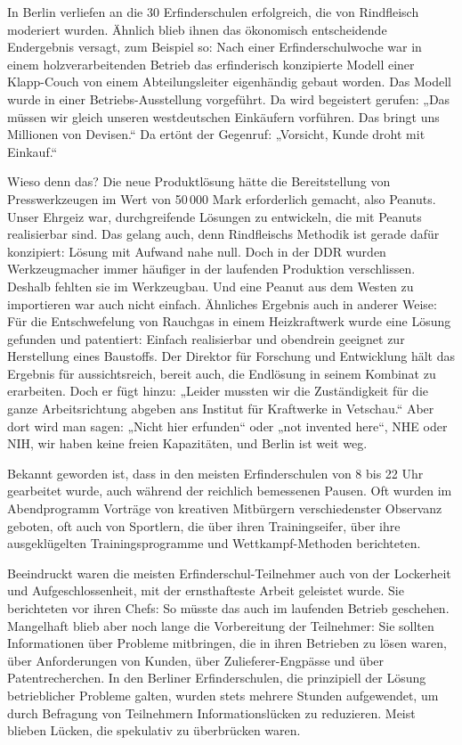 \documentclass[11pt,a4paper]{article}
\begin{document}
In Berlin verliefen an die 30 Erfinderschulen erfolgreich, die von Rindfleisch
moderiert wurden. Ähnlich blieb ihnen das ökonomisch entscheidende Endergebnis
versagt, zum Beispiel so: Nach einer Erfinderschulwoche war in einem
holzverarbeitenden Betrieb das erfinderisch konzipierte Modell einer
Klapp-Couch von einem Abteilungsleiter eigenhändig gebaut worden. Das Modell
wurde in einer Betriebs-Ausstellung vorgeführt. Da wird begeistert gerufen:
„Das müssen wir gleich unseren westdeutschen Einkäufern vorführen. Das bringt
uns Millionen von Devisen.“ Da ertönt der Gegenruf: „Vorsicht, Kunde droht mit
Einkauf.“

Wieso denn das? Die neue Produktlösung hätte die Bereitstellung von
Presswerkzeugen im Wert von 50\,000 Mark erforderlich gemacht, also Peanuts.
Unser Ehrgeiz war, durchgreifende Lösungen zu entwickeln, die mit Peanuts
realisierbar sind. Das gelang auch, denn Rindfleischs Methodik ist gerade dafür
konzipiert: Lösung mit Aufwand nahe null. Doch in der DDR wurden Werkzeugmacher
immer häufiger in der laufenden Produktion verschlissen. Deshalb fehlten sie im
Werkzeugbau. Und eine Peanut aus dem Westen zu importieren war auch nicht
einfach. Ähnliches Ergebnis auch in anderer Weise: Für die Entschwefelung von
Rauchgas in einem Heizkraftwerk wurde eine Lösung gefunden und patentiert:
Einfach realisierbar und obendrein geeignet zur Herstellung eines Baustoffs.
Der Direktor für Forschung und Entwicklung hält das Ergebnis für
aussichtsreich, bereit auch, die Endlösung in seinem Kombinat zu erarbeiten.
Doch er fügt hinzu: „Leider mussten wir die Zuständigkeit für die ganze
Arbeitsrichtung abgeben ans Institut für Kraftwerke in Vetschau.“ Aber dort
wird man sagen: „Nicht hier erfunden“ oder „not invented here“, NHE oder NIH,
wir haben keine freien Kapazitäten, und Berlin ist weit weg.

Bekannt geworden ist, dass in den meisten Erfinderschulen von 8 bis 22 Uhr
gearbeitet wurde, auch während der reichlich bemessenen Pausen. Oft wurden im
Abendprogramm Vorträge von kreativen Mitbürgern verschiedenster Observanz
geboten, oft auch von Sportlern, die über ihren Trainingseifer, über ihre
ausgeklügelten Trainingsprogramme und Wettkampf-Methoden berichteten.

Beeindruckt waren die meisten Erfinderschul-Teilnehmer auch von der Lockerheit
und Aufgeschlossenheit, mit der ernsthafteste Arbeit geleistet wurde. Sie
berichteten vor ihren Chefs: So müsste das auch im laufenden Betrieb geschehen.
Mangelhaft blieb aber noch lange die Vorbereitung der Teilnehmer: Sie sollten
Informationen über Probleme mitbringen, die in ihren Betrieben zu lösen waren,
über Anforderungen von Kunden, über Zulieferer-Engpässe und über
Patentrecherchen.  In den Berliner Erfinderschulen, die prinzipiell der Lösung
betrieblicher Probleme galten, wurden stets mehrere Stunden aufgewendet, um
durch Befragung von Teilnehmern Informationslücken zu reduzieren. Meist blieben
Lücken, die spekulativ zu überbrücken waren.
\end{document}
